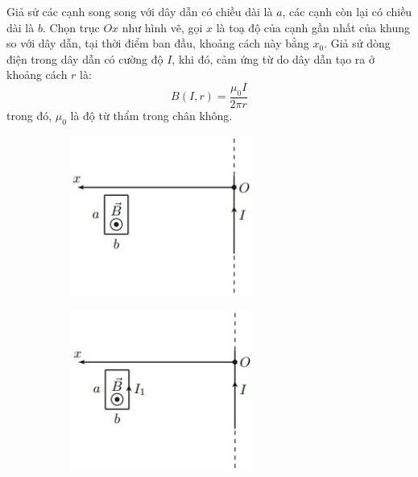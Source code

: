 \noindent Giả sử các cạnh song song với dây dẫn có chiều dài là $a$, các cạnh còn lại có chiều dài là $b$. Chọn trục $Ox$ như hình vẽ, gọi $x$ là toạ độ của cạnh gần nhất của khung so với dây dẫn, tại thời điểm ban đầu, khoảng cách này bằng $x_{0}$. Giả sử dòng điện trong dây dẫn có cường độ $I$, khi đó, cảm ứng từ do dây dẫn tạo ra ở khoảng cách $r$ là:
\begin{equation*}
  B(I,r)=\frac{\mu_{0}I}{2\pi r}
\end{equation*}
trong đó, $\mu_{0}$ là độ từ thẩm trong chân không. \\

\begin{figure}[h]
  \centering
  \begin{subfigure}[b]{0.49\textwidth}
    \centering
    \includegraphics[width=0.65\textwidth]{Figures/Fig 4S1.jpg}
  \end{subfigure}
  \hfill
  \begin{subfigure}[b]{0.49\textwidth}
    \centering
    \includegraphics[width=0.65\textwidth]{Figures/Fig 4S2.jpg}
  \end{subfigure}
\end{figure}

